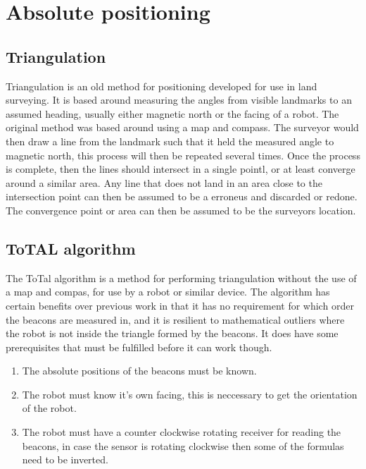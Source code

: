 \section{Absolute positioning}

\subsection{Triangulation}

Triangulation is an old method for positioning developed for use in land surveying. It is based around measuring the angles from visible landmarks to an assumed heading, usually either magnetic north or the facing of a robot. The original method was based around using a map and compass. The surveyor would then draw a line from the landmark such that it held the measured angle to magnetic north, this process will then be repeated several times. Once the process is complete, then the lines should intersect in a single pointl, or at least converge around a similar area. Any line that does not land in an area close to the intersection point can then be assumed to be a erroneus and discarded or redone. The convergence point or area can then be assumed to be the surveyors location.

\subsection{ToTAL algorithm}

The ToTal algorithm is a method for performing triangulation without the use of a map and compas, for use by a robot or similar device. The algorithm has certain benefits over previous work in that it has no requirement for which order the beacons are measured in, and it is resilient to mathematical outliers where the robot is not inside the triangle formed by the beacons. It does have some prerequisites that must be fulfilled before it can work though. 

\begin{enumerate}
\item The absolute positions of the beacons must be known. 
\item The robot must know it's own facing, this is neccessary to get the orientation of the robot. 
\item The robot must have a counter clockwise rotating receiver for reading the beacons, in case the sensor is rotating clockwise then some of the formulas need to be inverted.
\end{enumerate}

